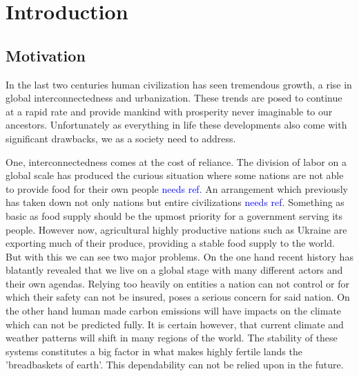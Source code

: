 \chapter{Introduction}
\label{chap:Introduction}


\section{Motivation}
\label{sec:Motivation}
In the last two centuries human civilization has seen tremendous growth, a rise in global interconnectedness and urbanization.
These trends are posed to continue at a rapid rate and provide mankind with prosperity never imaginable to our ancestors.
Unfortunately as everything in life these developments also come with significant drawbacks, we as a society need to address.

One, interconnectedness comes at the cost of reliance.
The division of labor on a global scale has produced the curious situation where some nations are not able to provide food for their own people \textcolor{Blue}{needs ref.}
An arrangement which previously has taken down not only nations but entire civilizations \textcolor{Blue}{needs ref}.
Something as basic as food supply should be the upmost priority for a government serving its people.
However now, agricultural highly productive nations such as Ukraine are exporting much of their produce, providing a stable food supply to the world.
But with this we can see two major problems.
On the one hand recent history has blatantly revealed that we live on a global stage with many different actors and their own agendas.
Relying too heavily on entities a nation can not control or for which their safety can not be insured, poses a serious concern for said nation.
On the other hand human made carbon emissions will have impacts on the climate which can not be predicted fully.
It is certain however, that current climate and weather patterns will shift in many regions of the world.
The stability of these systems constitutes a big factor in what makes highly fertile lands the 'breadbaskets of earth'.
This dependability can not be relied upon in the future.

